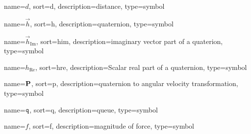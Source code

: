 	{%
		name=\ensuremath{d},
		sort=d,
		description=distance,
		type=symbol
	}
	\newcommand{\distance}{\gls{sym:distance}}

	{%
		name=\ensuremath{\vec{h}},
		sort=h,
		description=quaternion,
		type=symbol
	}
	\newcommand{\quaternion}{\gls{sym:quaternion}}

	{%
		name=\ensuremath{\vec{h}_{\mathrm{Im}}}, %
		sort=him,
		description=imaginary vector part of a quaterion,
		type=symbol
	}
	\newcommand{\quaternionimg}{\gls{sym:quaternionimg}}

	{%
		name=\ensuremath{h_{\mathrm{Re}}}, %
		sort=hre,
		description=Scalar real part of a quaternion,
		type=symbol
	}
	\newcommand{\quaternionre}{\gls{sym:quaternionre}}

	{%
		name=\ensuremath{\mat{P}}, %
		sort=p,
		description=quaternion to angular velocity transformation,
		type=symbol
	}
	\newcommand{\quaternionToAvelTrans}{\gls{sym:quaternionToAvelTrans}}

	{%
		name=\ensuremath{\code{q}},
		sort=q,
		description=queue,
		type=symbol
	}
	\newcommand{\queue}{\gls{sym:queue}}

	{%
		name=\ensuremath{f},
		sort=f,
		description=magnitude of force,
		type=symbol
	}
	\newcommand{\forcemag}{\gls{sym:forcemag}}

